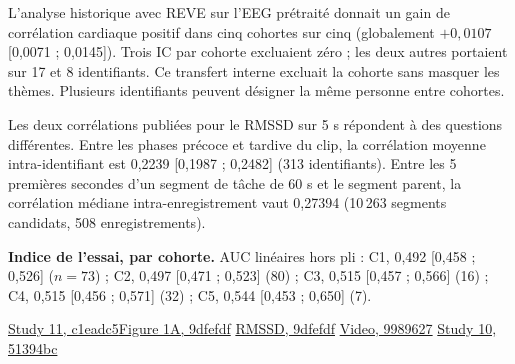 \documentclass[10pt]{article}
\begin{document}
L’analyse historique avec REVE sur l’EEG prétraité donnait un gain de corrélation cardiaque positif dans cinq cohortes sur cinq (globalement $+0{,}0107$ [0,0071 ; 0,0145]). Trois IC par cohorte excluaient zéro ; les deux autres portaient sur 17 et 8 identifiants. Ce transfert interne excluait la cohorte sans masquer les thèmes. Plusieurs identifiants peuvent désigner la même personne entre cohortes.

Les deux corrélations publiées pour le RMSSD sur 5 s répondent à des questions différentes. Entre les phases précoce et tardive du clip, la corrélation moyenne intra-identifiant est 0,2239 [0,1987 ; 0,2482] (313 identifiants). Entre les 5 premières secondes d’un segment de tâche de 60 s et le segment parent, la corrélation médiane intra-enregistrement vaut 0,27394 (10\,263 segments candidats, 508 enregistrements).

\textbf{Indice de l’essai, par cohorte.} AUC linéaires hors pli : C1, 0,492 [0,458 ; 0,526] ($n=73$) ; C2, 0,497 [0,471 ; 0,523] (80) ; C3, 0,515 [0,457 ; 0,566] (16) ; C4, 0,515 [0,456 ; 0,571] (32) ; C5, 0,544 [0,453 ; 0,650] (7).

\smallskip
\small\href{https://github.com/mathiaschebbah/habs/actions/runs/45854683170}{Study 11, c1eadc5}\quad\href{https://github.com/mathiaschebbah/habs/actions/runs/44635398113/attempts/2}{Figure 1A, 9dfefdf}
\quad\href{https://github.com/mathiaschebbah/habs/actions/runs/44635461916/attempts/2}{RMSSD, 9dfefdf}
\quad\href{https://github.com/mathiaschebbah/habs/actions/runs/45091493959}{Video, 9989627}
\quad\href{https://github.com/mathiaschebbah/habs/actions/runs/45604993423}{Study 10, 51394bc}
\end{document}

